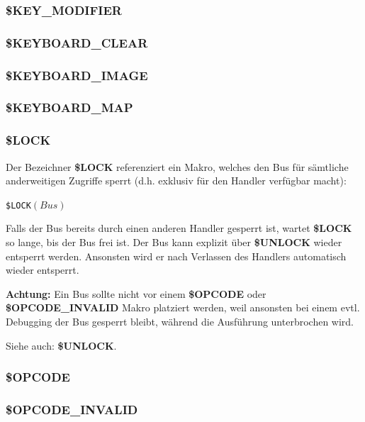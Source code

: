 \documentclass{scrartcl}
\begin{document}
\subsubsection{\$KEY\_MODIFIER}

\subsubsection{\$KEYBOARD\_CLEAR}

\subsubsection{\$KEYBOARD\_IMAGE}

\subsubsection{\$KEYBOARD\_MAP}

\subsubsection{\$LOCK}

\noindent Der Bezeichner \textbf{\$LOCK} referenziert ein Makro, welches den Bus für sämtliche anderweitigen Zugriffe sperrt (d.h. exklusiv für den Handler verfügbar macht):

\vspace{10pt}
\texttt{\$LOCK$(Bus)$}

\vspace{10pt}
\noindent Falls der Bus bereits durch einen anderen Handler gesperrt ist, wartet \textbf{\$LOCK} so lange, bis der Bus frei ist. Der Bus kann explizit über \textbf{\$UNLOCK} wieder entsperrt werden. Ansonsten wird er nach Verlassen des Handlers automatisch wieder entsperrt.

\vspace{10pt}
\noindent \textbf{Achtung:} Ein Bus sollte nicht vor einem \textbf{\$OPCODE} oder \textbf{\$OPCODE\_INVALID} Makro platziert werden, weil ansonsten bei einem evtl. Debugging der Bus gesperrt bleibt, während die Ausführung unterbrochen wird.

\vspace{10pt}
\noindent Siehe auch: \textbf{\$UNLOCK}.

\subsubsection{\$OPCODE}

\subsubsection{\$OPCODE\_INVALID}
\end{document}
